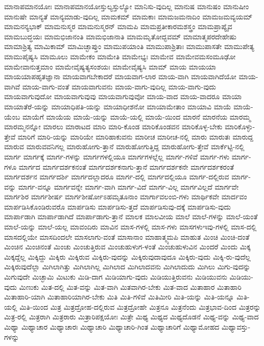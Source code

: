 {ಮಾನಾಪಮಾನಯೋಃ
ಮಾನಾಪಮಾನಯೋಸ್ತುಲ್ಯಸ್ತುಲ್ಯೋ
ಮಾನಿಸು-ವುದಿಲ್ಲ
ಮಾನುಷ
ಮಾನುಷಂ
ಮಾನುಷೀಂ
ಮಾನುಷೇ
ಮಾನ್ಯತೆ
ಮಾನ್ಯಮಾಡು-ವುದಿಲ್ಲ
ಮಾಮಕಮ್
ಮಾಮಕಾಃ
ಮಾಮಜಮನಾದಿಂ
ಮಾಮಜಮವ್ಯಯಮ್
ಮಾಮನನ್ಯಭಾಕ್
ಮಾಮನುಸ್ಮರ
ಮಾಮನುಸ್ಮರನ್
ಮಾಮಪಿ
ಮಾಮಪ್ರತೀಕಾರಮಶಸ್ತ್ರಂ
ಮಾಮಪ್ರಾಪ್ಯೈವ
ಮಾಮಬುದ್ಧಯಃ
ಮಾಮಭಿಜಾನಂತಿ
ಮಾಮಭಿಜಾನಾತಿ
ಮಾಮಮೃತೋದ್ಭವಮ್
ಮಾಮಾತ್ಮಪರದೇಹೇಷು
ಮಾಮಾಶ್ರಿತ್ಯ
ಮಾಮಿಕಾಮ್
ಮಾಮಿಚ್ಛಾಪ್ತುಂ
ಮಾಮುಪಯಾಂತಿ
ಮಾಮುಪಾಶ್ರಿತಾಃ
ಮಾಮುಪಾಸತೇ
ಮಾಮುಪೇತ್ಯ
ಮಾಮುಪೈಷ್ಯಸಿ
ಮಾಮೂಲು
ಮಾಮೇಕಂ
ಮಾಮೇತಿ
ಮಾಮೇಭ್ಯಃ
ಮಾಮೇವ
ಮಾಮೇವಮಸಂಮೂಢೋ
ಮಾಮೇವಾನುತ್ತಮಾಂ
ಮಾಮೇವೈಷ್ಯತ್ಯಸಂಶಯಃ
ಮಾಮೇವೈಷ್ಯಸಿ
ಮಾಮ್
ಮಾಯ
ಮಾಯಯಾ
ಮಾಯಯಾಪಹೃತಜ್ಞಾನಾ
ಮಾಯವಾಗಬೇಕಾದರೆ
ಮಾಯವಾಗ-ಲಾರ
ಮಾಯ-ವಾಗಿ
ಮಾಯವಾಗಿದೆಯೋ
ಮಾಯ-ವಾಗಿವೆ
ಮಾಯ-ವಾಗು-ವಂತೆ
ಮಾಯವಾಗುವನು
ಮಾಯ-ವಾಗು-ವುದಿಲ್ಲ
ಮಾಯ-ವಾಗು-ವುದು
ಮಾಯವಾಗುವುದೋ
ಮಾಯವಾಗುವುವು
ಮಾಯವಾಗುವುವೋ
ಮಾಯ-ವಾದ
ಮಾಯ-ವಾದರೂ
ಮಾಯಾ
ಮಾಯಾತೆರೆ-ಯನ್ನು
ಮಾಯಾಧಿಪತಿ-ಯನ್ನು
ಮಾಯಾಧೀಶನೋ
ಮಾಯಾಮೇತಾಂ
ಮಾಯಾವಿ
ಮಾಯೆ
ಮಾಯೆ-ಯೆಂಬ
ಮಾಯೆಗೆ
ಮಾಯೆಯ
ಮಾಯೆ-ಯನ್ನು
ಮಾಯೆ-ಯಲ್ಲಿ
ಮಾಯೆ-ಯಿಂದ
ಮಾರನೆ
ಮಾರನೆಯ
ಮಾರಮ್ಮ
ಮಾರಮ್ಮನನ್ನೋ
ಮಾರಲು
ಮಾರಾಟದ
ಮಾರಿ
ಮಾರಿ-ಕೊಂಡ
ಮಾರಿಕೊಂಡವನ
ಮಾರಿಕೊಳ್ಳ-ಬೇಕು
ಮಾರಿಕೊಳ್ಳು-ತ್ತೇವೆ
ಮಾರಿಗೆ
ಮಾರಿ-ಯನ್ನು
ಮಾರಿಯೇ
ಮಾರಿಹಾಕುವನು
ಮಾರೀಚ
ಮಾರೀಚ-ನಲ್ಲಿ
ಮಾರು
ಮಾರುತಃ
ಮಾರುದ್ದ
ಮಾರುವ
ಮಾರುವವನಿಗಲ್ಲ
ಮಾರುಹೋಗು-ತ್ತಾನೆ
ಮಾರುಹೋಗುತ್ತಿದ್ದ
ಮಾರುಹೋಗು-ತ್ತೇವೆ
ಮಾರ್ಕೆಟ್ಟಿ-ನಲ್ಲಿ
ಮಾರ್ಗ
ಮಾರ್ಗಕ್ಕೆ
ಮಾರ್ಗ-ಗಳನ್ನು
ಮಾರ್ಗಗಳಲ್ಲಿಯೂ
ಮಾರ್ಗಗಳಲ್ಲೆಲ್ಲ
ಮಾರ್ಗ-ಗಳಿವೆ
ಮಾರ್ಗ-ಗಳು
ಮಾರ್ಗ-ಗಳೂ
ಮಾರ್ಗದ
ಮಾರ್ಗದರ್ಶಕನಂತೆ
ಮಾರ್ಗದರ್ಶಕನಾಗು-ತ್ತಾನೆ
ಮಾರ್ಗದರ್ಶಕನೇ
ಮಾರ್ಗದರ್ಶಕರಂತೆ
ಮಾರ್ಗದರ್ಶನ
ಮಾರ್ಗದರ್ಶಿ
ಮಾರ್ಗದಲ್ಲಾದರೂ
ಮಾರ್ಗ-ದಲ್ಲಿ
ಮಾರ್ಗದಲ್ಲಿಯೂ
ಮಾರ್ಗ-ದಲ್ಲಿರುವ
ಮಾರ್ಗ-ವನ್ನು
ಮಾರ್ಗ-ವನ್ನೂ
ಮಾರ್ಗವನ್ನೇ
ಮಾರ್ಗ-ವಾಗಿ
ಮಾರ್ಗ-ವಿದೆ
ಮಾರ್ಗ-ವಿಲ್ಲ
ಮಾರ್ಗವಿಲ್ಲದೆ
ಮಾರ್ಗವೇ
ಮಾರ್ಗಶಿರ
ಮಾರ್ಗಶೀರ್ಷ
ಮಾರ್ಗಶೀರ್ಷೋಽಹಮೃತೂನಾಂ
ಮಾರ್ಗಾವಲಂಬಿ-ಗಳು
ಮಾರ್ಥಿಕವೇ
ಮಾರ್ದವಂ
ಮಾರ್ಪಡಿಸಿಕೊಂಡಿರುವರೊ
ಮಾರ್ಪಡಿಸು
ಮಾರ್ಪಡಿಸು-ತ್ತದೆ
ಮಾರ್ಪಡಿಸುವು-ದಕ್ಕೆ
ಮಾರ್ಪಡಿಸು-ವುದು
ಮಾರ್ಪಾಡಾಗಿ
ಮಾರ್ಪಾಡಾಗಿದೆ
ಮಾರ್ಪಾಡಾಗು-ತ್ತಾನೆ
ಮಾಲಕ
ಮಾಲವೀಯ
ಮಾಲೆ
ಮಾಲೆ-ಗಳನ್ನು
ಮಾಲೆ-ಯಂತೆ
ಮಾಲೆ-ಯನ್ನು
ಮಾಲೆ-ಯಲ್ಲ
ಮಾವಂದಿರು
ಮಾವಿನ
ಮಾಸ-ಗಳಲ್ಲಿ
ಮಾಸ-ಗಳು
ಮಾಸಗಳುಇವು-ಗಳಲ್ಲಿ
ಮಾಸ-ದಲ್ಲಿ
ಮಾಸದಲ್ಲಿಯೇ
ಮಾಸದಿಂದಲೇ
ಮಾಸಲಾಗು-ವಂತೆ
ಮಾಸಾನಾಂ
ಮಾಹಾತ್ಮ್ಯಮಪಿ
ಮಾಹುತ
ಮಿಂಚಿ
ಮಿಂಚಿ-ದಂತೆ
ಮಿಂಚಿನ
ಮಿಂಚಿನಂತೆ
ಮಿಂಚು
ಮಿಂಚುತ್ತಿರುವ
ಮಿಂಚುಹುಳುಗ-ಳಂತೆ
ಮಿಂಚುಹುಳುವಿನ
ಮಿಂದರೆ
ಮಿಂದು
ಮಿಕ್ಕ
ಮಿಕ್ಕದ್ದೆಲ್ಲ
ಮಿಕ್ಕಿದ್ದು
ಮಿಕ್ಕಿರು
ಮಿಕ್ಕಿರುವ
ಮಿಕ್ಕಿರು-ವುದನ್ನು
ಮಿಕ್ಕಿರುವುದಾವುದೂ
ಮಿಕ್ಕಿರು-ವುದು
ಮಿಕ್ಕಿ-ರು-ವುದೆಲ್ಲ
ಮಿಕ್ಕಿರುವುದೆಲ್ಲಾ
ಮಿಗಿಲಾಗಿತ್ತು
ಮಿಗಿಲಾಗಿಲ್ಲ
ಮಿಗಿಲಾದ
ಮಿಗಿಲಾದವನು
ಮಿಗಿಲಾದುದು
ಮಿಗಿಲು
ಮಿಗು-ವುದನ್ನು
ಮಿಗುವುದೇ
ಮಿಚ್ಛಾಮಿ
ಮಿಟುಕು
ಮಿಡಿ-ದಾಗ
ಮಿಡಿಯಾಗು-ವುದು
ಮಿಡಿಯುತ್ತಿರುವನು
ಮಿಡಿಯುವನು
ಮಿಡಿಯು-ವುದು
ಮಿಣುಕು
ಮಿತ-ದಲ್ಲಿ
ಮಿತ-ವನ್ನು
ಮಿತ-ವಾಗಿ
ಮಿತವಾಗಿರ-ಬೇಕು
ಮಿತ-ವಾದ
ಮಿತಾಹಾರ
ಮಿತಾಹಾರಿ
ಮಿತಾಹಾರಿ-ಯಾಗಿ
ಮಿತಾಹಾರಿಯಾಗಿರ-ಬೇಕು
ಮಿತಿ
ಮಿತಿ-ಗಳಿವೆ
ಮಿತಿಮೀರಿ
ಮಿತಿ-ಯನ್ನು
ಮಿತಿ-ಯನ್ನೂ
ಮಿತಿ-ಯಲ್ಲಿ
ಮಿತಿ-ಯಿಂದ
ಮಿತ್ರ
ಮಿತ್ರದ್ರೋಹ-ದಲ್ಲಿರುವ
ಮಿತ್ರದ್ರೋಹೇ
ಮಿತ್ರನೂ
ಮಿತ್ರನೆಂದು
ಮಿತ್ರಭಾವ-ದಿಂದ
ಮಿತ್ರರನ್ನು
ಮಿತ್ರ-ರಲ್ಲಿ
ಮಿತ್ರರಾಗಿ
ಮಿತ್ರರಾರು
ಮಿತ್ರಾರಿಪಕ್ಷಯೋಃ
ಮಿತ್ರೇ
ಮಿಥ್ಯ
ಮಿಥ್ಯದ
ಮಿಥ್ಯದೊಡನೆ
ಮಿಥ್ಯ-ವನ್ನು
ಮಿಥ್ಯ-ವಾದ
ಮಿಥ್ಯಾ
ಮಿಥ್ಯಾಚಾರ
ಮಿಥ್ಯಾಚಾರಃ
ಮಿಥ್ಯಾಚಾರಿ
ಮಿಥ್ಯಾಚಾರಿ-ಗಿಂತ
ಮಿಥ್ಯಾಚಾರಿಗೆ
ಮಿಥ್ಯಾಮೋಹದ
ಮಿಥ್ಯಾವಸ್ತು-ಗಳನ್ನು
}

